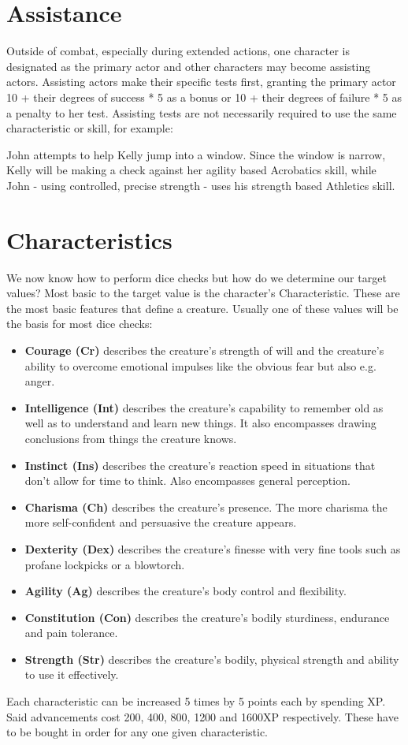\documentclass[12pt,a4paper,openany]{book}
\begin{document}
	\section{Assistance}
	Outside of combat, especially during extended actions, one character is designated as the primary actor and other characters may become assisting actors. Assisting actors make their specific tests first, granting the primary actor 10 + their degrees of success * 5 as a bonus or 10 + their degrees of failure * 5 as a penalty to her test. Assisting tests are not necessarily required to use the same characteristic or skill, for example:\par
	\begin{exampleblock}
		John attempts to help Kelly jump into a window. Since the window is narrow, Kelly will be making a check against her agility based Acrobatics skill, while John - using controlled, precise strength - uses his strength based Athletics skill.
	\end{exampleblock}

	\section{Characteristics}
	We now know how to perform dice checks but how do we determine our target values? Most basic to the target value is the character’s Characteristic. These are the most basic features that define a creature. Usually one of these values will be the basis for most dice checks:
	\begin{itemize}
		\setlength\itemsep{-8mm}
		\item \textbf{Courage (Cr)} describes the creature’s strength of will and the creature’s ability to overcome emotional impulses like the obvious fear but also e.g. anger.
		\item \textbf{Intelligence (Int)} describes the creature’s capability to remember old as well as to understand and learn new things. It also encompasses drawing conclusions from things the creature knows.
		\item \textbf{Instinct (Ins)} describes the creature’s reaction speed in situations that don’t allow for time to think. Also encompasses general perception.
		\item \textbf{Charisma (Ch)} describes the creature’s presence. The more charisma the more self-confident and persuasive the creature appears.
		\item \textbf{Dexterity (Dex)} describes the creature’s finesse with very fine tools such as profane lockpicks or a blowtorch.
		\item \textbf{Agility (Ag)} describes the creature’s body control and flexibility.
		\item \textbf{Constitution (Con)} describes the creature’s bodily sturdiness, endurance and pain tolerance.
		\item \textbf{Strength (Str)} describes the creature’s bodily, physical strength and ability to use it effectively.
	\end{itemize}
	Each characteristic can be increased 5 times by 5 points each by spending XP. Said advancements cost 200, 400, 800, 1200 and 1600XP respectively. These have to be bought in order for any one given characteristic.
\end{document}
